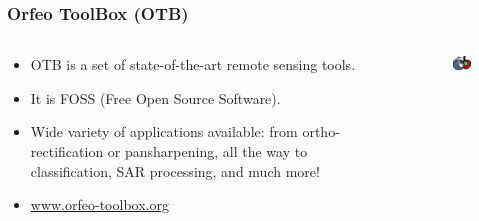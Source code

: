 \documentclass[aspectratio=169]{beamer}
\begin{document}
\begin{frame}
    \frametitle{Orfeo ToolBox (OTB)}
    \begin{columns}
        \begin{column}{0.5\textwidth}
            \begin{itemize}
                \item OTB is a set of state-of-the-art remote sensing tools.
                \item It is FOSS (Free Open Source Software).
                \item Wide variety of applications available: from 
                    ortho-rectification or pansharpening, all the way to 
                    classification, SAR processing, and much more!
                \item \url{www.orfeo-toolbox.org}
            \end{itemize}
        \end{column}
        \begin{column}{0.5\textwidth}
            \begin{figure}
                \centering
                \includegraphics[scale=0.8]{logos/orfeo-toolbox.png}
            \end{figure}
        \end{column}
    \end{columns}
\end{frame}
\end{document}
